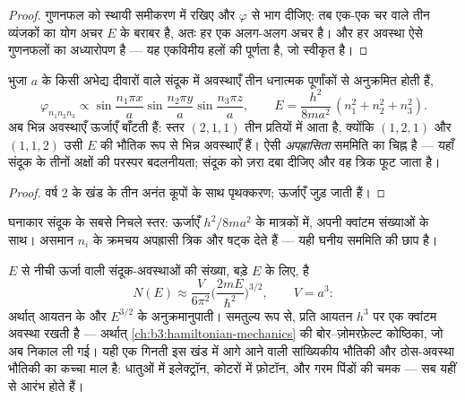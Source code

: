 \begin{proof}
गुणनफल को स्थायी समीकरण में रखिए और
$\varphi$ से भाग दीजिए: तब एक-एक चर वाले तीन व्यंजकों का योग अचर
$E$ के बराबर है, अतः हर एक अलग-अलग अचर है। और हर अवस्था ऐसे गुणनफलों
का अध्यारोपण है --- यह एकविमीय हलों की पूर्णता है, जो स्वीकृत है।
\end{proof}

\begin{proposition}\label{prop:b3:schrodinger-three-dimensions:box}
भुजा $a$ के किसी अभेद्य दीवारों वाले संदूक में अवस्थाएँ तीन धनात्मक
पूर्णांकों से अनुक्रमित होती हैं,
\[
\varphi_{n_1n_2n_3} \propto
\sin\frac{n_1\pi x}{a}\sin\frac{n_2\pi y}{a}\sin\frac{n_3\pi z}{a} ,
\qquad
E = \frac{h^2}{8ma^2}\,(n_1^2 + n_2^2 + n_3^2) .
\]
अब भिन्न अवस्थाएँ ऊर्जाएँ बाँटती हैं: स्तर $(2,1,1)$ तीन प्रतियों में
आता है, क्योंकि $(1,2,1)$ और $(1,1,2)$ उसी $E$ की भौतिक रूप से भिन्न
अवस्थाएँ हैं। ऐसी \emph{अपह्रासिता} सममिति का चिह्न है ---
यहाँ संदूक के तीनों अक्षों की परस्पर बदलनीयता; संदूक को ज़रा दबा
दीजिए और वह त्रिक फूट जाता है।
\end{proposition}

\begin{proof}
वर्ष 2 के खंड के तीन अनंत कूपों के साथ पृथक्करण; ऊर्जाएँ
जुड़ जाती हैं।
\end{proof}

\begin{omfigure}

{\small घनाकार संदूक के सबसे निचले स्तर: ऊर्जाएँ
$h^2/8ma^2$ के मात्रकों में, अपनी क्वांटम संख्याओं के साथ। असमान
$n_i$ के क्रमचय अपह्रासी त्रिक और षट्क देते हैं --- यही घनीय सममिति की
छाप है।}
\end{omfigure}

\begin{proposition}[अवस्थाएँ गिनना]\label{prop:b3:schrodinger-three-dimensions:counting}
$E$ से नीची ऊर्जा वाली संदूक-अवस्थाओं की संख्या, बड़े $E$ के लिए, है
\[
N(E) \approx \frac{V}{6\pi^2}\Big(\frac{2mE}{\hbar^2}\Big)^{3/2} ,
\qquad V = a^3 :
\]
अर्थात् आयतन के और $E^{3/2}$ के अनुक्रमानुपाती। समतुल्य रूप से,  प्रति आयतन $h^3$ पर एक क्वांटम अवस्था रखती है --- अर्थात्
\cref{ch:b3:hamiltonian-mechanics} की बोर--ज़ोमरफ़ेल्ट कोष्ठिका, जो
अब निकाल ली गई। यही एक गिनती
इस खंड में आगे आने वाली सांख्यिकीय भौतिकी और ठोस-अवस्था
भौतिकी का कच्चा माल है: धातुओं में इलेक्ट्रॉन, कोटरों में फ़ोटॉन,
और गरम पिंडों की चमक --- सब यहीं से आरंभ होते हैं।
\end{proposition}

